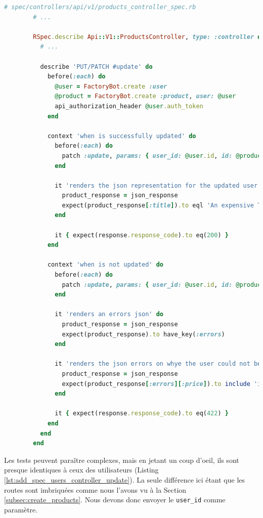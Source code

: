 \documentclass[]{report}
\begin{document}
      \begin{scriptsize}
        \begin{lstlisting}[language=ruby, caption={Test de mise à jour des produits}, label={lst:update_index_products_controller_spec}]
        # spec/controllers/api/v1/products_controller_spec.rb
        # ...

        RSpec.describe Api::V1::ProductsController, type: :controller do
          # ...

          describe 'PUT/PATCH #update' do
            before(:each) do
              @user = FactoryBot.create :user
              @product = FactoryBot.create :product, user: @user
              api_authorization_header @user.auth_token
            end

            context 'when is successfully updated' do
              before(:each) do
                patch :update, params: { user_id: @user.id, id: @product.id, product: { title: 'An expensive TV' } }
              end

              it 'renders the json representation for the updated user' do
                product_response = json_response
                expect(product_response[:title]).to eql 'An expensive TV'
              end

              it { expect(response.response_code).to eq(200) }
            end

            context 'when is not updated' do
              before(:each) do
                patch :update, params: { user_id: @user.id, id: @product.id, product: { price: 'two hundred' } }
              end

              it 'renders an errors json' do
                product_response = json_response
                expect(product_response).to have_key(:errors)
              end

              it 'renders the json errors on whye the user could not be created' do
                product_response = json_response
                expect(product_response[:errors][:price]).to include 'is not a number'
              end

              it { expect(response.response_code).to eq(422) }
            end
          end
        end
        \end{lstlisting}
      \end{scriptsize}

      Les tests peuvent paraître complexes, mais en jetant un coup d'oeil, ils sont presque identiques à ceux des utilisateurs (Listing \ref{lst:add_spec_users_controller_update}). La seule différence ici étant que les routes sont imbriquées comme nous l'avons vu à la Section \ref{subsec:create_products}. Nous devons donc envoyer le \verb|user_id| comme paramètre.
\end{document}
